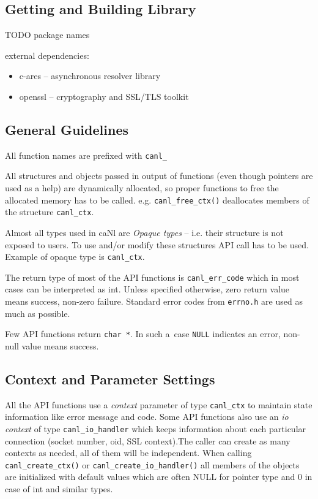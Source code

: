 \subsection{Getting and Building Library}
TODO package names

external dependencies:
\begin{itemize}
\item c-ares -- asynchronous resolver library
\item openssl -- cryptography and SSL/TLS toolkit
\end{itemize}

\subsection{General Guidelines}

%
All function names are prefixed with \verb'canl_'

%
All structures and objects passed in output of functions
(even though pointers are used as a help)
are dynamically allocated, so proper functions to free the allocated 
memory has to be called. e.g. \verb'canl_free_ctx()' 
deallocates members of the structure \verb'canl_ctx'.

%
Almost all types used in caNl are \textit{Opaque types} -- i.e. their structure is 
not exposed to users. To use and/or modify these structures API call has 
to be used. Example of opaque type is {\tt canl\_ctx}.

%
The return type of most of the API functions is {\tt canl\_err\_code} which
 in most cases can be interpreted as int. Unless specified otherwise, zero
return value means success, non-zero failure. Standard error codes from 
{\tt errno.h} are used as much as possible.

Few API functions return {\tt char *}. In such a~case
{\tt NULL} indicates an error, non-null value means success.

\subsection{Context and Parameter Settings}
\label{s:context}
All the API functions use a \emph{context} parameter of type {\tt canl\_ctx} 
to maintain state information like error message and code. 
Some API functions also use an \emph{io context} of type {\tt canl\_io\_handler}
which keeps information about each particular connection 
(\eg socket number, oid, SSL context).The caller can create as many 
contexts as needed, all of them will be independent. When calling
\verb'canl_create_ctx()' or \verb'canl_create_io_handler()' all members 
of the objects are initialized with default values which are often 
NULL for pointer type and 0 in case of int and similar types.

